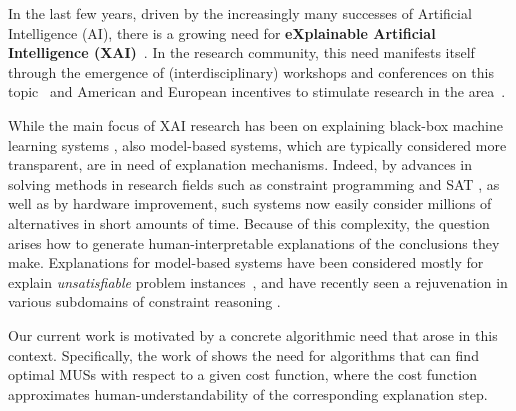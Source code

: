 
In the last few years, driven by the increasingly many successes of Artificial Intelligence (AI), there is a growing need for \textbf{eXplainable Artificial Intelligence (XAI)}~\cite{miller2019explanation}.
In the research community, this need manifests itself through the emergence of (interdisciplinary) workshops and conferences on this topic~\cite{xai-ijcai,FAT} and American and European incentives to stimulate research in the area~\cite{gunning2017explainable,hamonrobustness,fetproact}. 

While the main focus of XAI research has been on explaining black-box machine learning systems \cite{lundberg2017unified,guidotti2018survey,ignatiev2019abduction}, also model-based systems, which are typically considered more transparent, are in need of explanation mechanisms. 
Indeed, by advances in solving methods in research fields such as constraint programming \cite{fai/Rossi06} and SAT \cite{faia/2009-185}, as well as by hardware improvement, such systems now easily consider millions of alternatives in short amounts of time. 
Because of this complexity, the question arises how to generate human-interpretable explanations of the conclusions they make. 
Explanations for model-based systems have been considered mostly for explain \textit{unsatisfiable} problem instances~\cite{junker2001quickxplain}, and have recently seen a rejuvenation in various subdomains of constraint reasoning \cite{fox2017explainable,vcyras2019argumentation,chakraborti2017plan,ecai/BogaertsGCG20}.

Our current work is motivated by a concrete algorithmic need that arose in this context. 
Specifically, the work of \citet{ecai/BogaertsGCG20} shows the need for algorithms that can find optimal MUSs with respect to a given cost function, where the cost function approximates human-understandability of the corresponding explanation step.

